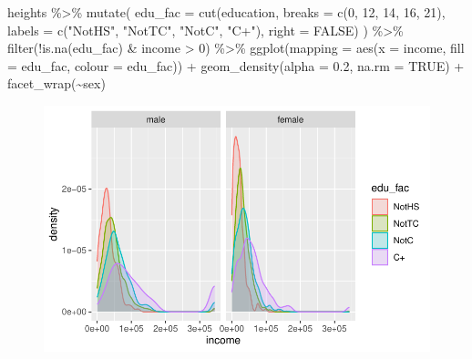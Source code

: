 \documentclass[
  letterpaper,
  DIV=11,
  numbers=noendperiod]{scrartcl}
\newenvironment{Shaded}{\begin{snugshade}}{\end{snugshade}}
\newcommand{\AttributeTok}[1]{\textcolor[rgb]{0.40,0.45,0.13}{#1}}
\newcommand{\ConstantTok}[1]{\textcolor[rgb]{0.56,0.35,0.01}{#1}}
\newcommand{\DecValTok}[1]{\textcolor[rgb]{0.68,0.00,0.00}{#1}}
\newcommand{\FloatTok}[1]{\textcolor[rgb]{0.68,0.00,0.00}{#1}}
\newcommand{\FunctionTok}[1]{\textcolor[rgb]{0.28,0.35,0.67}{#1}}
\newcommand{\NormalTok}[1]{\textcolor[rgb]{0.00,0.23,0.31}{#1}}
\newcommand{\SpecialCharTok}[1]{\textcolor[rgb]{0.37,0.37,0.37}{#1}}
\newcommand{\StringTok}[1]{\textcolor[rgb]{0.13,0.47,0.30}{#1}}
\begin{document}
\begin{Shaded}
\begin{Highlighting}[]
\NormalTok{heights }\SpecialCharTok{\%\textgreater{}\%} 
  \FunctionTok{mutate}\NormalTok{(}
    \AttributeTok{edu\_fac =} \FunctionTok{cut}\NormalTok{(education, }
                  \AttributeTok{breaks =} \FunctionTok{c}\NormalTok{(}\DecValTok{0}\NormalTok{, }\DecValTok{12}\NormalTok{, }\DecValTok{14}\NormalTok{, }\DecValTok{16}\NormalTok{, }\DecValTok{21}\NormalTok{), }
                  \AttributeTok{labels =} \FunctionTok{c}\NormalTok{(}\StringTok{"NotHS"}\NormalTok{, }\StringTok{"NotTC"}\NormalTok{, }\StringTok{"NotC"}\NormalTok{, }\StringTok{"C+"}\NormalTok{),}
                  \AttributeTok{right =} \ConstantTok{FALSE}\NormalTok{) }
\NormalTok{  ) }\SpecialCharTok{\%\textgreater{}\%} 
  \FunctionTok{filter}\NormalTok{(}\SpecialCharTok{!}\FunctionTok{is.na}\NormalTok{(edu\_fac) }\SpecialCharTok{\&}\NormalTok{ income }\SpecialCharTok{\textgreater{}} \DecValTok{0}\NormalTok{) }\SpecialCharTok{\%\textgreater{}\%}
  \FunctionTok{ggplot}\NormalTok{(}\AttributeTok{mapping =} \FunctionTok{aes}\NormalTok{(}\AttributeTok{x =}\NormalTok{ income, }\AttributeTok{fill =}\NormalTok{ edu\_fac, }\AttributeTok{colour =}\NormalTok{ edu\_fac)) }\SpecialCharTok{+}
  \FunctionTok{geom\_density}\NormalTok{(}\AttributeTok{alpha =} \FloatTok{0.2}\NormalTok{, }\AttributeTok{na.rm =} \ConstantTok{TRUE}\NormalTok{) }\SpecialCharTok{+} 
  \FunctionTok{facet\_wrap}\NormalTok{(}\SpecialCharTok{\textasciitilde{}}\NormalTok{sex)}
\end{Highlighting}
\end{Shaded}

\begin{figure}[H]

{\centering \includegraphics{EDA_files/figure-pdf/unnamed-chunk-18-1.pdf}

}

\end{figure}
\end{document}
